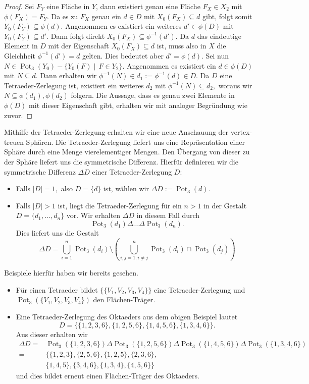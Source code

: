 \documentclass[12pt,titlepage,twoside,cleardoublepage]{article}
\theoremstyle{nummermitklammern}
\numberwithin{equation}{section}
\DeclareMathOperator{\Pot}{Pot}
\begin{document}
\begin{proof}
Sei $F_Y$ eine Fläche in $Y$, dann existiert genau eine Fläche $F_X\in X_2$ mit $\phi(F_X)=F_Y.$
 Da es zu $F_X$ genau ein $d\in D$ mit $X_0(F_X) \subseteq d$ gibt, folgt somit $Y_0(F_Y)\subseteq \phi(d).$
  Angenommen es existiert ein weiteres $d'\in \phi(D)$ mit $Y_0(F_Y)\subseteq d'$. Dann folgt direkt $X_0(F_X)\subseteq\phi^{-1}(d').$
   Da $d$ das eindeutige Element in $D$ mit der Eigenschaft $X_0(F_X)\subseteq d$ ist, muss also in $X$ die Gleichheit $\phi^{-1}(d')=d$ gelten. Dies bedeutet aber $d'=\phi(d).$ Sei nun $N\in \Pot_3(Y_0)-\{Y_0(F)\mid \,F \in Y_2\}.$ Angenommen es existiert ein $d\in \phi(D)$ mit $N\subseteq d.$ Dann erhalten wir $\phi^{-1}(N)\in d_1:=\phi^{-1}(d)\in D.$ Da  $D$ eine Tetraeder-Zerlegung ist, existiert ein weiteres $d_2$ mit $\phi^{-1}(N)\subseteq d_2,$ woraus wir $N\subseteq \phi(d_1),\phi(d_2)$ folgern. Die Aussage, dass es genau zwei Elemente in $\phi(D)$ mit dieser Eigenschaft gibt, erhalten wir mit analoger Begründung wie zuvor.  
\end{proof}
Mithilfe der Tetraeder-Zerlegung erhalten wir eine neue Anschauung der vertex-treuen Sphären. Die Tetraeder-Zerlegung liefert uns eine Repräsentation einer Sphäre durch eine Menge vierelementiger Mengen. Den Übergang von dieser zu der Sphäre liefert uns die symmetrische Differenz. Hierfür definieren wir die symmetrische Differenz $\Delta D$ einer Tetraeder-Zerlegung $D:$
\begin{itemize}
\item Falls $\vert D\vert =1,$ also $D=\{d\}$ ist, wählen wir $\Delta D:=\Pot_3(d).$
\item Falls $\vert D\vert >1$ ist, liegt die Tetraeder-Zerlegung für ein $n>1$ in der Gestalt $D=\{d_1,\ldots,d_n\}$ vor.
Wir  erhalten $\Delta D$ in diesem Fall durch
\[
\Pot_3(d_1)\Delta \ldots \Delta \Pot_3(d_n).
\]
Dies liefert uns die Gestalt 
\[
\Delta D=\bigcup^n_{i=1} \Pot_3(d_i)\setminus  \left(\bigcup^n_{i,j=1,i\neq j}\Pot_3(d_i)\cap \Pot_3(d_j)\right)
\]
\end{itemize} 
Beispiele hierfür haben wir bereits gesehen.
\begin{itemize}
\item Für einen Tetraeder bildet $\{\{V_1,V_2,V_3,V_4\}\}$ eine Tetraeder-Zerlegung und $\Pot_3(\{V_1,V_2,V_3,V_4\})$ den Flächen-Träger.
\item Eine Tetraeder-Zerlegung des Oktaeders aus dem obigen Beispiel lautet
 \[
D=\{\{1,2,3,6\},\{1,2,5,6\},\{1,4,5,6\},\{1,3,4,6\}\}. 
 \]
 Aus dieser erhalten wir 
 \begin{align*}
\Delta D=&\Pot_3(\{1,2,3,6\})\Delta\Pot_3(\{1,2,5,6\})\Delta\Pot_3(\{1,4,5,6\})\Delta\Pot_3(\{1,3,4,6\})\\
=&\{\{1,2,3\},\{2,5,6\},\{1,2,5\},\{2,3,6\},\\
&\{1,4,5\},\{3,4,6\},\{1,3,4\},\{4,5,6\}\}
\end{align*}
und dies bildet erneut einen Flächen-Träger des Oktaeders.
\end{itemize} 
\end{document}

